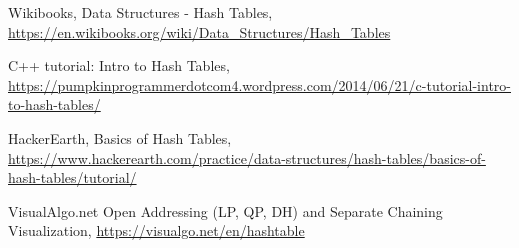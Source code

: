 \begin{thebibliography}{9}
Wikibooks, Data Structures - Hash Tables, \href{https://en.wikibooks.org/wiki/Data_Structures/Hash_Tables}{https://en.wikibooks.org/wiki/Data\_Structures/Hash\_Tables}

C++ tutorial: Intro to Hash Tables,
\href{https://pumpkinprogrammerdotcom4.wordpress.com/2014/06/21/c-tutorial-intro-to-hash-tables/}{https://pumpkinprogrammerdotcom4.wordpress.com/2014/06/21/c-tutorial-intro-to-hash-tables/}

HackerEarth, Basics of Hash Tables, \href{https://www.hackerearth.com/practice/data-structures/hash-tables/basics-of-hash-tables/tutorial/}{https://www.hackerearth.com/practice/data-structures/hash-tables/basics-of-hash-tables/tutorial/}

VisualAlgo.net Open Addressing (LP, QP, DH) and Separate Chaining Visualization, \href{https://visualgo.net/en/hashtable}{https://visualgo.net/en/hashtable}

\end{thebibliography}

